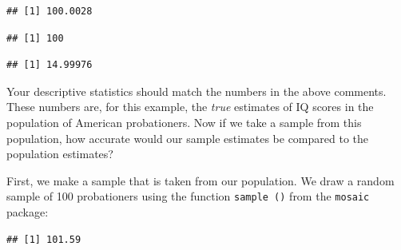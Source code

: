 \documentclass[
]{book}
\newenvironment{Shaded}{\begin{snugshade}}{\end{snugshade}}
\newcommand{\AttributeTok}[1]{\textcolor[rgb]{0.77,0.63,0.00}{#1}}
\newcommand{\CommentTok}[1]{\textcolor[rgb]{0.56,0.35,0.01}{\textit{#1}}}
\newcommand{\DecValTok}[1]{\textcolor[rgb]{0.00,0.00,0.81}{#1}}
\newcommand{\FunctionTok}[1]{\textcolor[rgb]{0.00,0.00,0.00}{#1}}
\newcommand{\NormalTok}[1]{#1}
\newcommand{\OtherTok}[1]{\textcolor[rgb]{0.56,0.35,0.01}{#1}}
\newcommand{\SpecialCharTok}[1]{\textcolor[rgb]{0.00,0.00,0.00}{#1}}
\begin{document}
\begin{verbatim}
## [1] 100.0028
\end{verbatim}

\begin{Shaded}
\end{Shaded}

\begin{verbatim}
## [1] 100
\end{verbatim}

\begin{Shaded}
\end{Shaded}

\begin{verbatim}
## [1] 14.99976
\end{verbatim}

Your descriptive statistics should match the numbers in the above comments. These numbers are, for this example, the \emph{true} estimates of IQ scores in the population of American probationers. Now if we take a sample from this population, how accurate would our sample estimates be compared to the population estimates?

First, we make a sample that is taken from our population. We draw a random sample of 100 probationers using the function \texttt{sample\ ()} from the \texttt{mosaic} package:

\begin{Shaded}
\end{Shaded}

\begin{verbatim}
## [1] 101.59
\end{verbatim}
\end{document}
